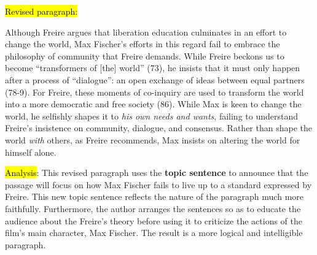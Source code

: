 \begin{tcolorbox}[enhanced,width=4.2in,left=.3in, right=.3in,
   drop fuzzy shadow southeast,
    boxrule=0.4pt,sharp corners,colframe=black!80!black,colback=white!10]

\medskip

{\small
\begin{doublespacing}

\hl{Revised paragraph:}\medskip

\hspace{.5cm}Although Freire argues that liberation education culminates in an effort to change the world, Max Fischer's efforts in this regard fail to embrace the philosophy of community that Freire demands. While Freire beckons us to become “transformers of [the] world” (73), he insists that it must only happen after a process of “dialogue”: an open exchange of ideas between equal partners (78-9). For Freire, these moments of co-inquiry are used to transform the world into a more democratic and free society (86). While Max is keen to change the world, he selfishly shapes it to \emph{his own needs and wants}, failing to understand Freire's insistence on community, dialogue, and consensus. Rather than shape the world \emph{with} others, as Freire recommends, Max insists on altering the world for himself alone.

\medskip

\end{doublespacing}}

\end{tcolorbox}

\hl{Analysis}: This revised paragraph uses the \textbf{topic sentence} to announce that the passage will focus on how Max Fischer fails to live up to a standard expressed by Freire. This new topic sentence reflects the nature of the paragraph much more faithfully. Furthermore, the author arranges the sentences so as to educate the audience about the Freire's theory before using it to criticize the actions of the film's main character, Max Fischer. The result is a more logical and intelligible paragraph.
